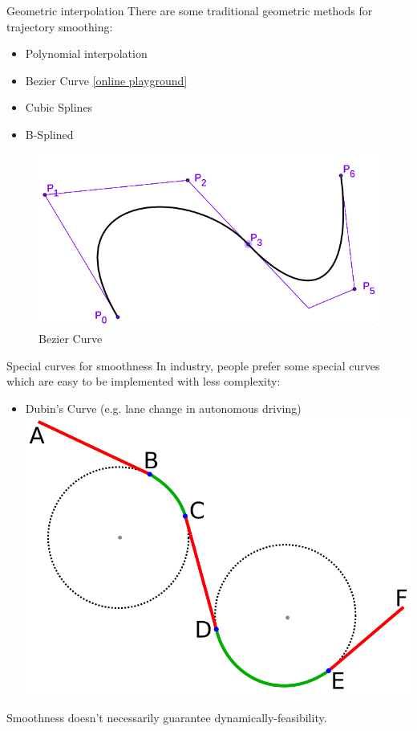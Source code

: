 \documentclass{beamer}
\newcommand{\red}[1]{{\color{red} #1}}
\begin{document}
\begin{frame}{Geometric interpolation}
	There are some traditional geometric methods for trajectory smoothing:
	\begin{itemize}
		\item Polynomial interpolation
		\item Bezier Curve \href{https://www.geogebra.org/m/r3UWE9KR}{[online playground]}
		\item Cubic Splines
		\item B-Splined
	\end{itemize}
	\begin{figure}
		\includegraphics[width=0.5\linewidth]{figures/bezier_curve.png}
		\caption{Bezier Curve}
	\end{figure}
\end{frame}

\begin{frame}{Special curves for smoothness}
	In industry, people prefer some special curves which are easy to be implemented with less complexity:
	\begin{itemize}
		\item Dubin’s Curve (e.g. lane change in autonomous driving)
		\includegraphics[width=0.5\linewidth]{figures/dubin-curve.png}
	\end{itemize}
	\red{Smoothness doesn't necessarily guarantee dynamically-feasibility.}
\end{frame}
\end{document}
